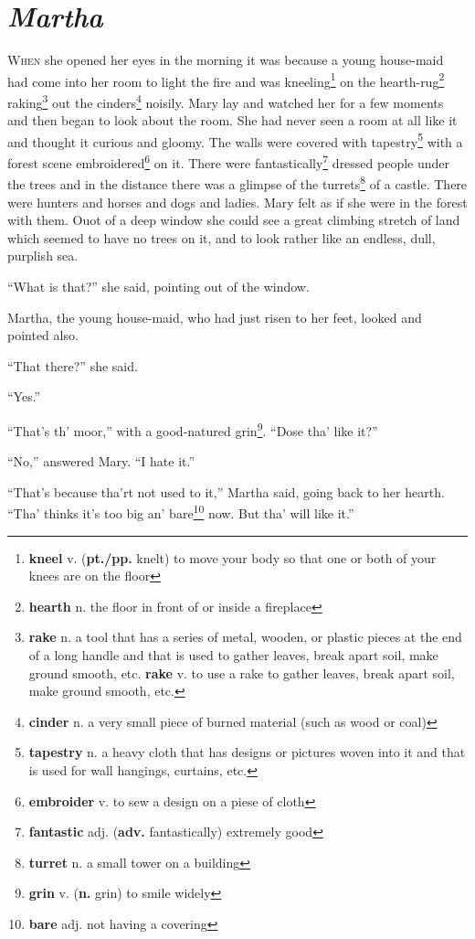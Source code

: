 \chapter{\textit{Martha}}
\lettrine{W}{hen} she opened her eyes in the morning it was because a young house-maid had come into her room to light the fire and was kneeling\footnote{\textbf{kneel} v. (\textbf{pt./pp.} knelt) to move your body so that one or both of your knees are on the floor} on the hearth-rug\footnote{\textbf{hearth} n. the floor in front of or inside a fireplace} raking\footnote{\textbf{rake} n. a tool that has a series of metal, wooden, or plastic pieces at the end of a long handle and that is used to gather leaves, break apart soil, make ground smooth, etc. \textbf{rake} v. to use a rake to gather leaves, break apart soil, make ground smooth, etc.} out the cinders\footnote{\textbf{cinder} n. a very small piece of burned material (such as wood or coal)} noisily. Mary lay and watched her for a few moments and then began to look about the room. She had never seen a room at all like it and thought it curious and gloomy. The walls were covered with tapestry\footnote{\textbf{tapestry} n. a heavy cloth that has designs or pictures woven into it and that is used for wall hangings, curtains, etc.} with a forest scene embroidered\footnote{\textbf{embroider} v. to sew a design on a piese of cloth} on it. There were fantastically\footnote{\textbf{fantastic} adj. (\textbf{adv.} fantastically) extremely good} dressed people under the trees and in the distance there was a glimpse of the turrets\footnote{\textbf{turret} n. a small tower on a building} of a castle. There were hunters and horses and dogs and ladies. Mary felt as if she were in the forest with them. Ouot of a deep window she could see a great climbing stretch of land which seemed to have no trees on it, and to look rather like an endless, dull, purplish sea.

``What is that?'' she said, pointing out of the window.

Martha, the young house-maid, who had just risen to her feet, looked and pointed also.

``That there?'' she said.

``Yes.''

``That's th' moor,'' with a good-natured grin\footnote{\textbf{grin} v. (\textbf{n.} grin) to smile widely}. ``Dose tha' like it?''

``No,'' answered Mary. ``I hate it.''

``That's because tha'rt not used to it,'' Martha said, going back to her hearth. ``Tha' thinks it's too big an' bare\footnote{\textbf{bare} adj. not having a covering} now. But tha' will like it.''

